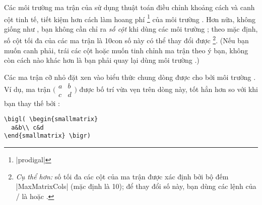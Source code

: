\documentclass[11pt,leqno,titlepage,openany]{amsldoc}[1999/12/13]
\begin{document}
\medskip
Các môi trường ma trận của  sử dụng thuật toán
điều chỉnh khoảng cách và canh cột tinh tế, tiết kiệm hơn cách làm hoang phí%
\footnote{|prodigal|} của môi trường .
Hơn nữa, không giống như , bạn không cần chỉ ra \emph{số cột}
khi dùng các môi trường ; theo mặc định, số cột tối đa của
các ma trận là 10\mdash con số này có thể thay đổi được%
\footnote{%
\emph{Cụ thể hơn:} số tối đa các cột của ma trận được xác định bởi bộ đếm |MaxMatrixCols|
(mặc định là 10); để thay đổi số này, bạn dùng các lệnh của \latex/ là
 hoặc .
}.
(Nếu bạn muốn canh phải, trái các cột hoặc muốn tinh chỉnh ma trận theo ý bạn,
không còn cách nào khác hơn là bạn phải quay lại dùng môi trường .)

\medskip
Các ma trận cỡ nhỏ đặt xen vào biểu thức chung dòng được cho bởi
môi trường . Ví dụ, ma trận
\begin{math}
\bigl( \begin{smallmatrix}
  a&b\\ c&d
\end{smallmatrix} \bigr)
\end{math}
được bố trí vừa vẹn trên dòng này, tốt hẳn hơn so
với khi bạn thay thế  bởi :

\medskip
\begin{verbatim}
\bigl( \begin{smallmatrix}
  a&b\\ c&d
\end{smallmatrix} \bigr)
\end{verbatim}
\end{document}
